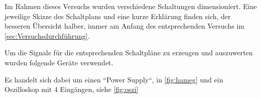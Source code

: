 \documentclass[11pt,ngerman]{scrartcl}
\begin{document}
Im Rahmen dieses Versuchs wurden verschiedene Schaltungen dimensioniert. Eine jeweilige Skizze des Schaltplans und eine kurze Erklärung finden sich, der besseren Übersicht halber, immer am Anfang des entsprechenden Versuchs im \autoref{sec:Versuchsdurchführung}.

\vspace{2mm}

Um die Signale für die entsprechenden Schaltpläne zu erzeugen und auszuwerten wurden folgende Geräte verwendet.

\vspace{2mm}

Es handelt sich dabei um einen ``Power Supply``, in \autoref{fig:hameg} und ein Oszilloskop mit 4 Eingängen, siehe \autoref{fig:oszi}

\vspace{2mm}
\end{document}
